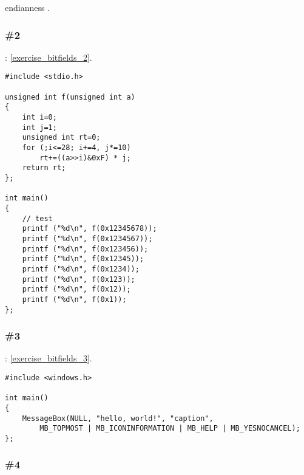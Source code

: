  \gls{endianness} 
.




\subsubsection{\Exercise \#2}
\label{exercise_solutions_bitfields_2}

\Exercise: \ref{exercise_bitfields_2}.


\begin{lstlisting}
#include <stdio.h>

unsigned int f(unsigned int a)
{
	int i=0;
	int j=1;
	unsigned int rt=0;
	for (;i<=28; i+=4, j*=10)
		rt+=((a>>i)&0xF) * j;
	return rt;
};

int main()
{
	// test
	printf ("%d\n", f(0x12345678));
	printf ("%d\n", f(0x1234567));
	printf ("%d\n", f(0x123456));
	printf ("%d\n", f(0x12345));
	printf ("%d\n", f(0x1234));
	printf ("%d\n", f(0x123));
	printf ("%d\n", f(0x12));
	printf ("%d\n", f(0x1));
};
\end{lstlisting}

\subsubsection{\Exercise \#3}
\label{exercise_solutions_bitfields_3}

\Exercise: \ref{exercise_bitfields_3}.

\begin{lstlisting}
#include <windows.h>

int main()
{
	MessageBox(NULL, "hello, world!", "caption", 
		MB_TOPMOST | MB_ICONINFORMATION | MB_HELP | MB_YESNOCANCEL);
};
\end{lstlisting}

\subsubsection{\Exercise \#4}
\label{exercise_solutions_bitfields_4}

